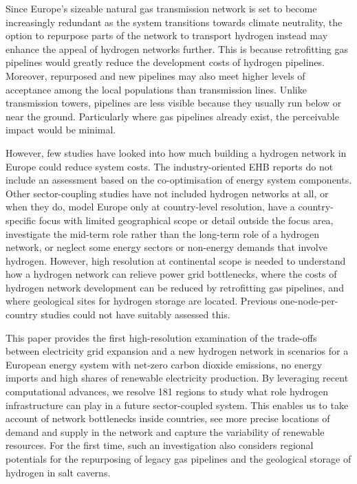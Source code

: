 Since Europe's sizeable natural gas transmission network is set to become
increasingly redundant as the system transitions towards climate neutrality, the
option to repurpose parts of the network to transport hydrogen instead may
enhance the appeal of hydrogen networks further. This is because retrofitting
gas pipelines would greatly reduce the development costs of hydrogen
pipelines.\cite{cerniauskasOptionsNatural2020,tsikliosHydrogenTransport2022}
Moreover, repurposed and new pipelines may also meet higher levels of acceptance
among the local populations than transmission
lines.\cite{schonauerHydrogenFuture2022} Unlike transmission towers, pipelines
are less visible because they usually run below or near the ground. Particularly
where gas pipelines already exist, the perceivable impact would be minimal.

However, few studies have looked into how much building a hydrogen network in
Europe could reduce system costs. The industry-oriented EHB reports do not
include an assessment based on the co-optimisation of energy system components.
\cite{gasforclimateEuropeanHydrogen2020,gasforclimateEuropeanHydrogen2021,gasforclimateExtendingEuropean2021,gasforclimateEuropeanHydrogen2022}
Other sector-coupling studies have not included hydrogen networks at all,
\cite{brownSynergiesSector2018,pickeringDiversityOptions2022,childFlexibleElectricity2019,kendziorskiCentralizedDecentral2022a}
or when they do, model Europe only at country-level resolution,
\cite{europeancommission.directorategeneralforenergy.METISStudy2021,victoriaSpeedTechnological2022}
have a country-specific focus with limited geographical scope or detail outside
the focus area,\cite{gilsInteractionHydrogen2021} investigate the mid-term
role rather than the long-term role of a hydrogen
network,\cite{europeancommission.directorategeneralforenergy.METISStudy2021} or
neglect some energy sectors or non-energy demands that involve hydrogen.
\cite{gilsInteractionHydrogen2021,Caglayan2019,caglayanRobustDesign2021}
However, high resolution at continental scope is needed to understand how a
hydrogen network can relieve power grid bottlenecks, where the costs of hydrogen
network development can be reduced by retrofitting gas pipelines, and where
geological sites for hydrogen storage are located. Previous one-node-per-country
studies could not have suitably assessed this.

This paper provides the first high-resolution examination of the trade-offs
between electricity grid expansion and a new hydrogen network in scenarios for a
European energy system with net-zero carbon dioxide emissions, no energy imports
and high shares of renewable electricity production. By leveraging recent
computational advances, we resolve 181 regions to study what role hydrogen
infrastructure can play in a future sector-coupled system. This enables us to
take account of network bottlenecks inside countries, see more precise locations
of demand and supply in the network and capture the variability of renewable
resources. For the first time, such an investigation also considers regional
potentials for the repurposing of legacy gas pipelines and the geological
storage of hydrogen in salt caverns.

